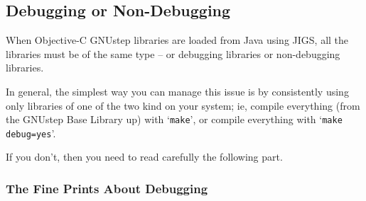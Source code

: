 \subsection{Debugging or Non-Debugging}

When Objective-C GNUstep libraries are loaded from Java using JIGS,
all the libraries must be of the same type -- or debugging libraries
or non-debugging libraries.  

In general, the simplest way you can manage this issue is by
consistently using only libraries of one of the two kind on your
system; ie, compile everything (from the GNUstep Base Library up) with
`\texttt{make}', or compile everything with `\texttt{make debug=yes}'.

If you don't, then you need to read carefully the following part.

\subsubsection{The Fine Prints About Debugging}

